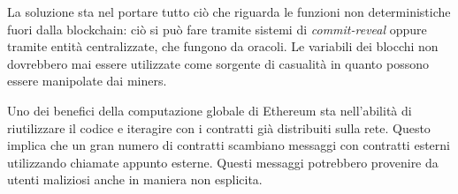 La soluzione sta nel portare tutto ciò che riguarda le funzioni non deterministiche fuori dalla blockchain: ciò si può fare tramite sistemi di \textit{commit-reveal} oppure tramite entità centralizzate, che fungono da oracoli. Le variabili dei blocchi non dovrebbero mai essere utilizzate come sorgente di casualità in quanto possono essere manipolate dai miners.

\vspace{5mm}

Uno dei benefici della computazione globale di Ethereum sta nell'abilità di riutilizzare il codice e iteragire con i contratti già distribuiti sulla rete. Questo implica che un gran numero di contratti scambiano messaggi con contratti esterni utilizzando chiamate appunto esterne. Questi messaggi potrebbero provenire da utenti maliziosi anche in maniera non esplicita.

